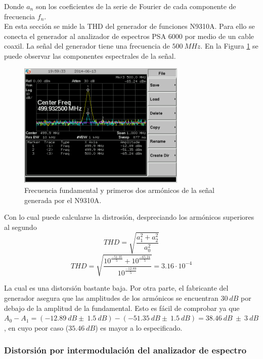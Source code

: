 \documentclass[a4paper,10pt]{article}
\begin{document}
		\indent Donde $a_n$ son los coeficientes de la serie de Fourier de cada 
		componente de frecuencia $f_n$. \\
		\indent En esta secci\'on se mide la THD del generador de funciones 
		N9310A. Para ello se conecta el generador al analizador de espectros PSA
		6000 por medio de un cable coaxil. La se\~nal del generador tiene una 
		frecuencia de $500~MHz$. En la Figura \ref{THD} se puede observar las 
		componentes espectrales de la se\~nal.
		
		\begin{figure}[!htb]
				\centering
				\includegraphics[width=8cm]
				{Imagenes/SCREN445.png}
				\caption{Frecuencia fundamental y primeros dos arm\'onicos de la
				se\~nal generada por el N9310A.}
				\label{THD} 
		\end{figure}
		
		\indent Con lo cual puede calcularse la distrosi\'on, despreciando los 
		arm\'onicos superiores al segundo
		$$THD=\sqrt{\frac{a^2_1+a^2_2}{a^2_0}}$$
		$$THD=\sqrt{\frac{10^{\frac{-51.35}{5}}+10^{\frac{-65.24}{5}}}{10^{
		\frac{-12.89}{5}}}}=3.16\cdot10^{-4}$$
		
		
		\indent La cual es una distorsi\'on bastante baja. Por otra parte, el 
		fabricante del generador asegura que las amplitudes de los arm\'onicos 
		se encuentran $30~dB$ por debajo de la amplitud de la fundamental. Esto 
		es f\'acil de comprobar ya que 
		$A_0-A_1=(-12.89~dB\pm~1.5~dB)-(-51.35~dB\pm~1.5~dB)=38.46~dB~\pm~3~dB$,
		en cuyo peor caso ($35.46~dB$) es mayor a lo especificado.
		
		\subsubsection{Distorsi\'on por intermodulaci\'on del analizador de 
		espectro}
\end{document}

